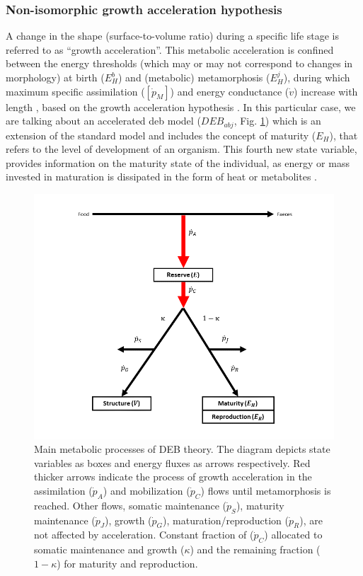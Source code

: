 \subsubsection{Non-isomorphic growth acceleration hypothesis}

A change in the shape (surface-to-volume ratio) during a specific life stage is referred to as ``growth acceleration''. This metabolic acceleration is confined between the energy thresholds (which may or may not correspond to changes in morphology) at birth ($E_H^b$) and (metabolic) metamorphosis ($E_H^j$), during which maximum specific assimilation ($\left [ \dot{p}_{M} \right ]$) and energy conductance ($\dot{v}$) increase with length \citep{KooiLika2014}, based on the growth acceleration hypothesis \citep{OsseBoog1997,JohnBjor2001,WalkMcCo2004,PaulFroe2023}. In this particular case, we are talking about an accelerated \acrshort{deb} model ($DEB_{abj}$, Fig. \ref{Chap4DEBfluxbox}) which is an extension of the standard model and includes the concept of maturity ($E_{H}$), that refers to the level of development of an organism. This fourth new state variable, provides information on the maturity state of the individual, as energy or mass invested in maturation is dissipated in the form of heat or metabolites \citep{JusuKlan2011}.

\begin{figure}[ht]
	\includegraphics[width=1.0\textwidth]{figures/Chap4DEBfluxbox.png}
	\centering
	\caption{Main metabolic processes of DEB theory. The diagram depicts state variables as boxes and energy fluxes as arrows respectively. Red thicker arrows indicate the process of growth acceleration in the assimilation ($\dot{p}_{A}$) and mobilization ($\dot{p}_{C}$) flows until metamorphosis is reached. Other flows, somatic maintenance ($\dot{p}_{S}$), maturity maintenance ($\dot{p}_{J}$), growth ($\dot{p}_{G}$), maturation/reproduction ($\dot{p}_{R}$), are not affected by acceleration. Constant fraction of ($\dot{p}_{C}$) allocated to somatic maintenance and growth ($\kappa$) and the remaining fraction ($1-\kappa$) for maturity and reproduction.}
	\label{Chap4DEBfluxbox}
\end{figure}

